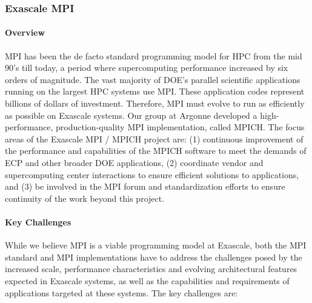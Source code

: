 \subsubsection{Exascale MPI} \label{subsubsect:mpich}
\paragraph{Overview}

MPI has been the de facto standard programming model for HPC from the
mid 90's till today, a period where supercomputing performance
increased by six orders of magnitude.  The vast majority of DOE's
parallel scientific applications running on the largest HPC systems
use MPI.  These application codes represent billions of dollars of
investment.  Therefore, MPI must evolve to run as efficiently as
possible on Exascale systems.  Our group at Argonne developed a
high-performance, production-quality MPI implementation, called MPICH.
The focus areas of the Exascale MPI / MPICH project are: (1)
continuous improvement of the performance and capabilities of the
MPICH software to meet the demands of ECP and other broader DOE
applications, (2) coordinate vendor and supercomputing center
interactions to ensure efficient solutions to applications, and (3) be
involved in the MPI forum and standardization efforts to ensure
continuity of the work beyond this project.


\paragraph{Key  Challenges}

While we believe MPI is a viable programming model at Exascale, both
the MPI standard and MPI implementations have to address the
challenges posed by the increased scale, performance characteristics
and evolving architectural features expected in Exascale systems, as
well as the capabilities and requirements of applications targeted at
these systems.  The key challenges are:


